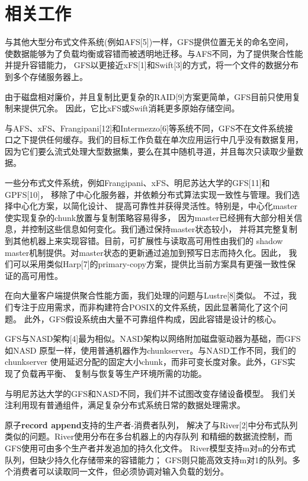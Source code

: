 \section{相关工作}

与其他大型分布式文件系统(例如AFS[5])一样，GFS提供位置无关的命名空间，
使数据能够为了负载均衡或容错而被透明地迁移。与AFS不同，为了提供聚合性能并提升容错能力，
GFS以更接近xFS[1]和Swift[3]的方式，将一个文件的数据分布到多个存储服务器上。

由于磁盘相对廉价，并且复制比更复杂的RAID[9]方案更简单，GFS目前只使用复制来提供冗余。
因此，它比xFS或Swift消耗更多原始存储空间。

与AFS、xFS、Frangipani[12]和Intermezzo[6]等系统不同，GFS不在文件系统接
口之下提供任何缓存。我们的目标工作负载在单次应用运行中几乎没有数据复用，
因为它们要么流式处理大型数据集，要么在其中随机寻道，并且每次只读取少量数据。

一些分布式文件系统，例如Frangipani、xFS、明尼苏达大学的GFS[11]和GPFS[10]，
移除了中心化服务器，并依赖分布式算法实现一致性与管理。我们选择中心化方案，以简化设计、
提高可靠性并获得灵活性。特别是，中心化master使实现复杂的chunk放置与复制策略容易得多，
因为master已经拥有大部分相关信息，并控制这些信息如何变化。我们通过保持master状态较小，
并将其完整复制到其他机器上来实现容错。目前，可扩展性与读取高可用性由我们的
shadow master机制提供。对master状态的更新通过追加到预写日志而持久化。因此，
我们可以采用类似Harp[7]的primary-copy方案，提供比当前方案具有更强一致性保证的高可用性。

在向大量客户端提供聚合性能方面，我们处理的问题与Lustre[8]类似。
不过，我们专注于应用需求，而非构建符合POSIX的文件系统，因此显著简化了这个问题。
此外，GFS假设系统由大量不可靠组件构成，因此容错是设计的核心。

GFS与NASD架构[4]最为相似。NASD架构以网络附加磁盘驱动器为基础，而GFS如NASD
原型一样，使用普通机器作为chunkserver。与NASD工作不同，我们的chunkserver
使用延迟分配的固定大小chunk，而非可变长度对象。此外，GFS实现了负载再平衡、
复制与恢复等生产环境所需的功能。

与明尼苏达大学的GFS和NASD不同，我们并不试图改变存储设备模型。
我们关注利用现有普通组件，满足复杂分布式系统日常的数据处理需求。

原子\textbf{record append}支持的生产者-消费者队列，
解决了与River[2]中分布式队列类似的问题。River使用分布在多台机器上的内存队列
和精细的数据流控制，而GFS使用可由多个生产者并发追加的持久化文件。
River模型支持m对n的分布式队列，但缺少持久化存储带来的容错能力；
GFS则只能高效支持m对1的队列。多个消费者可以读取同一文件，但必须协调对输入负载的划分。
